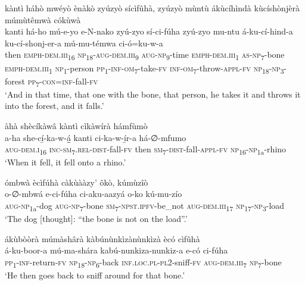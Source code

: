 kàntì háhò mwéyò ènàkò zyúzyò sícìfûhà, zyúzyò mùntù ákùcíhìndà kùcíshònjèrà múmùtêmwà cókùwà\\
\gll kanti  há-ho      mú-e-yo    e-N-nako    zyú-zyo   sí-ci-fúha  zyú-zyo    mu-ntu  á-ku-cí-hind-a ku-cí-shonj-er-a    mú-mu-témwa  ci-ó=ku-w-a \\
then  \textsc{emph}{}-\textsc{dem}.\textsc{iii}\textsubscript{16}  \textsc{np}\textsubscript{18}{}-\textsc{aug}{}-\textsc{dem}.\textsc{iii}\textsubscript{9} \textsc{aug}{}-\textsc{np}\textsubscript{9}{}-time  \textsc{emph}{}-\textsc{dem}.\textsc{iii}\textsubscript{1}
\textsc{as}{}-\textsc{np}\textsubscript{7}{}-bone   \textsc{emph}{}-\textsc{dem}.\textsc{iii}\textsubscript{1}  \textsc{np}\textsubscript{1}{}-person  \textsc{pp}\textsubscript{1}{}-\textsc{inf}{}-\textsc{om}\textsubscript{7}{}-take-\textsc{fv}
\textsc{inf}{}-\textsc{om}\textsubscript{7}{}-throw-\textsc{appl}{}-\textsc{fv}  \textsc{np}\textsubscript{18}{}-\textsc{np}\textsubscript{3}{}-forest  \textsc{pp}\textsubscript{7}{}-\textsc{con}=\textsc{inf}{}-fall-\textsc{fv}\\
\glt ‘And in that time, that one with the bone, that person, he takes it and throws it into the forest, and it falls.’\bigskip

àhà shècíkàwâ kàntì cìkàwírà hámfùmò\\
\gll a-ha    she-cí̲-ka-w-á̲̲    kanti ci-ka-w-í̲r-a      há-∅-mfumo \\
\textsc{aug}{}-\textsc{dem}.\textsc{i}\textsubscript{16}  \textsc{inc}{}-\textsc{sm}\textsubscript{7}.\textsc{rel}{}-\textsc{dist}{}-fall-\textsc{fv}  then
\textsc{sm}\textsubscript{7}{}-\textsc{dist}{}-fall-\textsc{appl}{}-\textsc{fv}  \textsc{np}\textsubscript{16}{}-\textsc{np}\textsubscript{1a}{}-rhino\\
\glt ‘When it fell, it fell onto a rhino.’\bigskip

ómbwà ècìfúhà càkùààzy’ ôkò, kúmùzîò\\
\gll o-∅-mbwá    e-ci-fúha    ci-aku-aazyá o-ko    kú-mu-zío \\
\textsc{aug}{}-\textsc{np}\textsubscript{1a}{}-dog  \textsc{aug}{}-\textsc{np}\textsubscript{7}{}-bone  \textsc{sm}\textsubscript{7}{}-\textsc{npst}.\textsc{ipfv}{}-be\_not
\textsc{aug}{}-\textsc{dem}.\textsc{iii}\textsubscript{17} \textsc{np}\textsubscript{17}{}-\textsc{np}\textsubscript{3}{}-load\\
\glt ‘The dog [thought]: “the bone is not on the load”.’\bigskip

\newpage
ákùbòòrà múmàshârà kàbúnùnkìzànùnkìzà ècó cìfûhà\\
\gll á-ku-boor-a    mú-ma-shára kabú-nunkiza-nunkiz-a  e-có    ci-fúha \\
\textsc{pp}\textsubscript{1}{}-\textsc{inf}{}-return-\textsc{fv}  \textsc{np}\textsubscript{18}{}-\textsc{np}\textsubscript{6}{}-back
\textsc{inf}.\textsc{loc}.\textsc{pl}{}-\textsc{pl}2-sniff-\textsc{fv}  \textsc{aug}{}-\textsc{dem}.\textsc{iii}\textsubscript{7}  \textsc{np}\textsubscript{7}{}-bone\\
\glt ‘He then goes back to sniff around for that bone.’\bigskip

